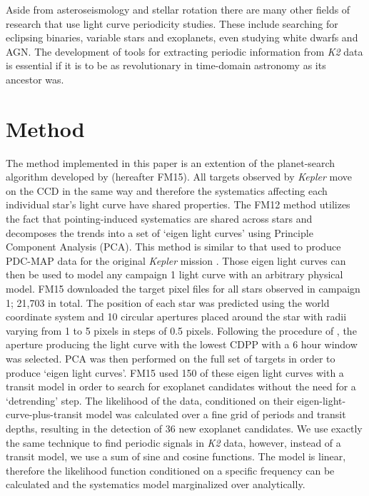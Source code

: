 \documentclass[useAMS, usenatbib]{aastex}
\begin{document}
Aside from asteroseismology and stellar rotation there are many other fields
of research that use light curve periodicity studies.
These include searching for eclipsing binaries, variable stars and exoplanets,
even studying white dwarfs and AGN.
The development of tools for extracting periodic information from {\it K2}
data is essential if it is to be as revolutionary in time-domain
astronomy as its ancestor was.

\section{Method}
\label{Method}

The method implemented in this paper is an extention of the planet-search
algorithm developed by \citet{Foreman-Mackey2015} (hereafter FM15).
All targets observed by {\it Kepler} move on the CCD in the same way and
therefore the systematics affecting each individual star's light curve have
shared properties.
The FM12 method utilizes the fact that pointing-induced systematics are shared
across stars and decomposes the trends into a set of `eigen light curves'
using Principle Component Analysis (PCA).
This method is similar to that used to produce PDC-MAP data for the original
{\it Kepler} mission \citep[][]{Stumpe2012, Smith2012}.
Those eigen light curves can then be used to model any campaign 1 {\it }light
curve with an arbitrary physical model.
FM15 downloaded the target pixel files for all stars observed in campaign 1;
21,703 in total.
The position of each star was predicted using the world coordinate system and
10 circular apertures placed around the star with radii varying from 1 to
5 pixels in steps of 0.5 pixels.
Following the procedure of \citet{Vanderburg2014}, the aperture producing the
light curve with the lowest CDPP with a 6 hour window \citet{Christiansen2012}
was selected.
PCA was then performed on the full set of targets in order to produce `eigen
light curves'.
FM15 used 150 of these eigen light curves with a transit model in order to
search for exoplanet candidates without the need for a `detrending' step.
The likelihood of the data, conditioned on their eigen-light-curve-plus-transit
model was calculated over a fine grid of periods and transit depths, resulting
in the detection of 36 new exoplanet candidates.
We use exactly the same technique to find periodic signals in {\it K2} data,
however, instead of a transit model, we use a sum of sine and cosine functions.
The model is linear, therefore the likelihood function conditioned on
a specific frequency can be calculated and the systematics model marginalized
over analytically.
\end{document}
